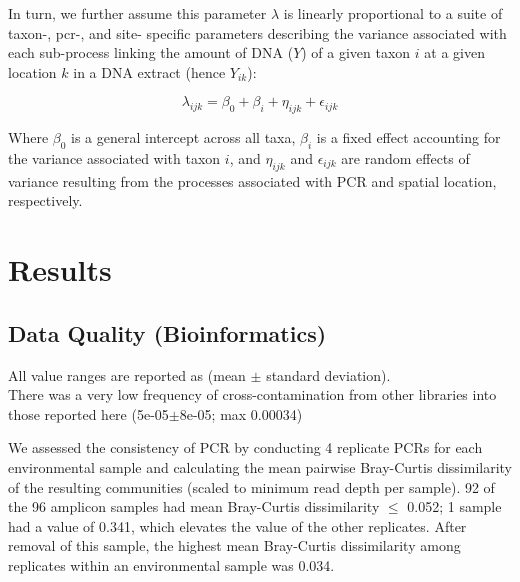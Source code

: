 \documentclass[11pt,letterpaper]{article} %
\begin{document}
In turn, we further assume this parameter $\lambda$ is linearly proportional to a suite of taxon-, pcr-, and site- specific parameters describing the variance associated with each sub-process linking the amount of DNA ($Y$) of a given taxon $i$ at a given location $k$ in a DNA extract (hence $Y_{ik}$):

\begin{equation}\label{GLM}
	\lambda_{ijk} = \beta_0 + \beta_i + \eta_{ijk} + \epsilon_{ijk}
\end{equation}

Where $\beta_0$ is a general intercept across all taxa, $\beta_i$ is a fixed effect accounting for the variance associated with taxon $i$, and $\eta_{ijk}$ and $\epsilon_{ijk}$ are random effects of variance resulting from the processes associated with PCR and spatial location, respectively.




%

\section*{Results}
\subsection*{Data Quality (Bioinformatics)}
All value ranges are reported as (mean $\pm$ standard deviation).\\
There was a very low frequency of cross-contamination from other libraries into those reported here (5e-05$\pm$8e-05; max 0.00034)

We assessed the consistency of PCR by conducting 4 replicate PCRs for each environmental sample and calculating the mean pairwise Bray-Curtis dissimilarity of the resulting communities (scaled to minimum read depth per sample). 
92 of the 96 amplicon samples had mean Bray-Curtis dissimilarity $\leq$ 0.052; 1 sample had a value of 0.341, which elevates the value of the other replicates. 
After removal of this sample, the highest mean Bray-Curtis dissimilarity among replicates within an environmental sample was 0.034. 
\end{document}
